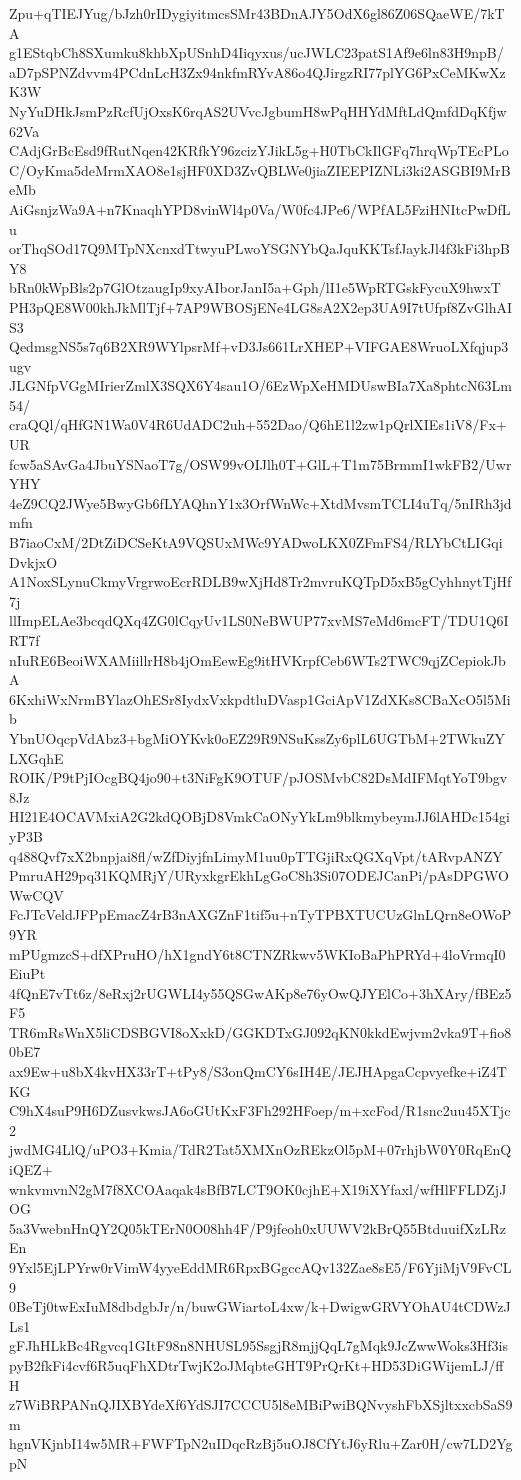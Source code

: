 Zpu+qTIEJYug/bJzh0rIDygiyitmcsSMr43BDnAJY5OdX6gl86Z06SQaeWE/7kTA
g1EStqbCh8SXumku8khbXpUSnhD4Iiqyxus/ucJWLC23patS1Af9e6ln83H9npB/
aD7pSPNZdvvm4PCdnLcH3Zx94nkfmRYvA86o4QJirgzRI77plYG6PxCeMKwXzK3W
NyYuDHkJsmPzRcfUjOxsK6rqAS2UVvcJgbumH8wPqHHYdMftLdQmfdDqKfjw62Va
CAdjGrBcEsd9fRutNqen42KRfkY96zcizYJikL5g+H0TbCkIlGFq7hrqWpTEcPLo
C/OyKma5deMrmXAO8e1sjHF0XD3ZvQBLWe0jiaZIEEPIZNLi3ki2ASGBI9MrBeMb
AiGsnjzWa9A+n7KnaqhYPD8vinWl4p0Va/W0fc4JPe6/WPfAL5FziHNItcPwDfLu
orThqSOd17Q9MTpNXcnxdTtwyuPLwoYSGNYbQaJquKKTsfJaykJl4f3kFi3hpBY8
bRn0kWpBls2p7GlOtzaugIp9xyAIborJanI5a+Gph/lI1e5WpRTGskFycuX9hwxT
PH3pQE8W00khJkMlTjf+7AP9WBOSjENe4LG8sA2X2ep3UA9I7tUfpf8ZvGlhAIS3
QedmsgNS5s7q6B2XR9WYlpsrMf+vD3Js661LrXHEP+VIFGAE8WruoLXfqjup3ugv
JLGNfpVGgMIrierZmlX3SQX6Y4sau1O/6EzWpXeHMDUswBIa7Xa8phtcN63Lm54/
craQQl/qHfGN1Wa0V4R6UdADC2uh+552Dao/Q6hE1l2zw1pQrlXIEs1iV8/Fx+UR
fcw5aSAvGa4JbuYSNaoT7g/OSW99vOIJlh0T+GlL+T1m75BrmmI1wkFB2/UwrYHY
4eZ9CQ2JWye5BwyGb6fLYAQhnY1x3OrfWnWc+XtdMvsmTCLI4uTq/5nIRh3jdmfn
B7iaoCxM/2DtZiDCSeKtA9VQSUxMWc9YADwoLKX0ZFmFS4/RLYbCtLIGqiDvkjxO
A1NoxSLynuCkmyVrgrwoEcrRDLB9wXjHd8Tr2mvruKQTpD5xB5gCyhhnytTjHf7j
llImpELAe3bcqdQXq4ZG0lCqyUv1LS0NeBWUP77xvMS7eMd6mcFT/TDU1Q6IRT7f
nIuRE6BeoiWXAMiillrH8b4jOmEewEg9itHVKrpfCeb6WTs2TWC9qjZCepiokJbA
6KxhiWxNrmBYlazOhESr8IydxVxkpdtluDVasp1GciApV1ZdXKs8CBaXcO5l5Mib
YbnUOqcpVdAbz3+bgMiOYKvk0oEZ29R9NSuKssZy6plL6UGTbM+2TWkuZYLXGqhE
ROIK/P9tPjIOcgBQ4jo90+t3NiFgK9OTUF/pJOSMvbC82DsMdIFMqtYoT9bgv8Jz
HI21E4OCAVMxiA2G2kdQOBjD8VmkCaONyYkLm9blkmybeymJJ6lAHDc154giyP3B
q488Qvf7xX2bnpjai8fl/wZfDiyjfnLimyM1uu0pTTGjiRxQGXqVpt/tARvpANZY
PmruAH29pq31KQMRjY/URyxkgrEkhLgGoC8h3Si07ODEJCanPi/pAsDPGWOWwCQV
FcJTcVeldJFPpEmacZ4rB3nAXGZnF1tif5u+nTyTPBXTUCUzGlnLQrn8eOWoP9YR
mPUgmzcS+dfXPruHO/hX1gndY6t8CTNZRkwv5WKIoBaPhPRYd+4loVrmqI0EiuPt
4fQnE7vTt6z/8eRxj2rUGWLI4y55QSGwAKp8e76yOwQJYElCo+3hXAry/fBEz5F5
TR6mRsWnX5liCDSBGVI8oXxkD/GGKDTxGJ092qKN0kkdEwjvm2vka9T+fio80bE7
ax9Ew+u8bX4kvHX33rT+tPy8/S3onQmCY6sIH4E/JEJHApgaCcpvyefke+iZ4TKG
C9hX4suP9H6DZusvkwsJA6oGUtKxF3Fh292HFoep/m+xcFod/R1snc2uu45XTjc2
jwdMG4LlQ/uPO3+Kmia/TdR2Tat5XMXnOzREkzOl5pM+07rhjbW0Y0RqEnQiQEZ+
wnkvmvnN2gM7f8XCOAaqak4sBfB7LCT9OK0cjhE+X19iXYfaxl/wfHlFFLDZjJOG
5a3VwebnHnQY2Q05kTErN0O08hh4F/P9jfeoh0xUUWV2kBrQ55BtduuifXzLRzEn
9Yxl5EjLPYrw0rVimW4yyeEddMR6RpxBGgccAQv132Zae8sE5/F6YjiMjV9FvCL9
0BeTj0twExIuM8dbdgbJr/n/buwGWiartoL4xw/k+DwigwGRVYOhAU4tCDWzJLs1
gFJhHLkBc4Rgvcq1GItF98n8NHUSL95SsgjR8mjjQqL7gMqk9JcZwwWoks3Hf3is
pyB2fkFi4cvf6R5uqFhXDtrTwjK2oJMqbteGHT9PrQrKt+HD53DiGWijemLJ/ffH
z7WiBRPANnQJIXBYdeXf6YdSJI7CCCU5l8eMBiPwiBQNvyshFbXSjltxxcbSaS9m
hgnVKjnbI14w5MR+FWFTpN2uIDqcRzBj5uOJ8CfYtJ6yRlu+Zar0H/cw7LD2YgpN
